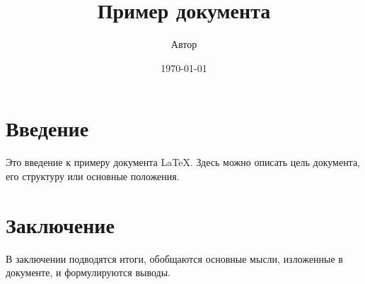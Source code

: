 \documentclass{article}
\title{Пример документа}
\author{Автор}
\date{\today}
\begin{document}
\maketitle

\section{Введение}
Это введение к примеру документа \LaTeX. Здесь можно описать цель документа, его структуру или основные положения.

\section{Заключение}
В заключении подводятся итоги, обобщаются основные мысли, изложенные в документе, и формулируются выводы.
\end{document}
